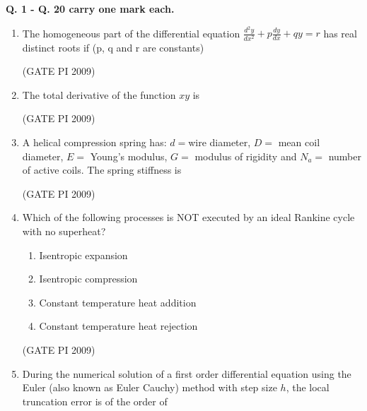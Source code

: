 \documentclass[journal,12pt,onecolumn]{IEEEtran}
\theoremstyle{remark}
\begin{document}
\newpage
 
\textbf{Q. 1 - Q. 20 carry one mark each.}

\begin{enumerate}[label=Q.\arabic*]

\item The homogeneous part of the differential equation
$\frac{d^2 y}{dx^2} + p \frac{dy}{dx} + q y = r$
has real distinct roots if (p, q and r are constants)
\begin{enumerate}[label=(\Alph*)]
\end{enumerate}
\hfill (GATE PI 2009) 
\item The total derivative of the function $xy$ is
\begin{enumerate}[label=(\Alph*)]
\end{enumerate}
\hfill (GATE PI 2009) 
\item A helical compression spring has: $ d = $wire diameter, $ D = $ mean coil diameter, $ E = $ Young's modulus, $ G = $ modulus of rigidity and $ N_a = $ number of active coils. The spring stiffness is
\begin{enumerate}[label=(\Alph*)]
\end{enumerate}
\hfill (GATE PI 2009)
\item Which of the following processes is NOT executed by an ideal Rankine cycle with no superheat?
\begin{enumerate}[label=(\Alph*)]
\item Isentropic expansion
\item Isentropic compression
\item Constant temperature heat addition
\item Constant temperature heat rejection
\end{enumerate}
\hfill (GATE PI 2009)
\item During the numerical solution of a first order differential equation using the Euler (also known as Euler Cauchy) method with step size $h$, the local truncation error is of the order of


\end{enumerate}
\end{document}
